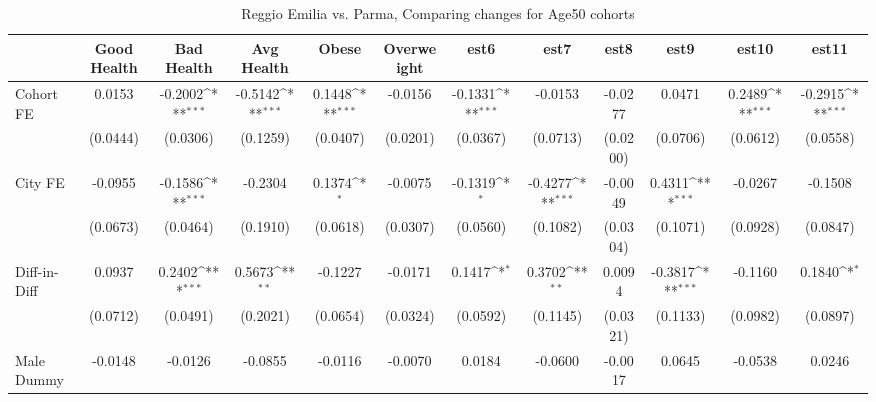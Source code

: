 \begin{table}[htbp]\centering
\def\sym#1{\ifmmode^{#1}\else\(^{#1}\)\fi}
\caption{Reggio Emilia vs. Parma, Comparing changes for Age50 cohorts}
\begin{tabular}{l*{11}{c}}
\toprule
            &\multicolumn{1}{c}{Good Health}&\multicolumn{1}{c}{Bad Health}&\multicolumn{1}{c}{Avg Health}&\multicolumn{1}{c}{Obese}&\multicolumn{1}{c}{Overweight}&\multicolumn{1}{c}{est6}&\multicolumn{1}{c}{est7}&\multicolumn{1}{c}{est8}&\multicolumn{1}{c}{est9}&\multicolumn{1}{c}{est10}&\multicolumn{1}{c}{est11}\\
\midrule
Cohort FE   &      0.0153         &     -0.2002\sym{***}&     -0.5142\sym{***}&      0.1448\sym{***}&     -0.0156         &     -0.1331\sym{***}&     -0.0153         &     -0.0277         &      0.0471         &      0.2489\sym{***}&     -0.2915\sym{***}\\
            &    (0.0444)         &    (0.0306)         &    (0.1259)         &    (0.0407)         &    (0.0201)         &    (0.0367)         &    (0.0713)         &    (0.0200)         &    (0.0706)         &    (0.0612)         &    (0.0558)         \\
\addlinespace
City FE     &     -0.0955         &     -0.1586\sym{***}&     -0.2304         &      0.1374\sym{*}  &     -0.0075         &     -0.1319\sym{*}  &     -0.4277\sym{***}&     -0.0049         &      0.4311\sym{***}&     -0.0267         &     -0.1508         \\
            &    (0.0673)         &    (0.0464)         &    (0.1910)         &    (0.0618)         &    (0.0307)         &    (0.0560)         &    (0.1082)         &    (0.0304)         &    (0.1071)         &    (0.0928)         &    (0.0847)         \\
\addlinespace
Diff-in-Diff&      0.0937         &      0.2402\sym{***}&      0.5673\sym{**} &     -0.1227         &     -0.0171         &      0.1417\sym{*}  &      0.3702\sym{**} &      0.0094         &     -0.3817\sym{***}&     -0.1160         &      0.1840\sym{*}  \\
            &    (0.0712)         &    (0.0491)         &    (0.2021)         &    (0.0654)         &    (0.0324)         &    (0.0592)         &    (0.1145)         &    (0.0321)         &    (0.1133)         &    (0.0982)         &    (0.0897)         \\
\addlinespace
Male Dummy  &     -0.0148         &     -0.0126         &     -0.0855         &     -0.0116         &     -0.0070         &      0.0184         &     -0.0600         &     -0.0017         &      0.0645         &     -0.0538         &      0.0246         \\

\end{tabular}
\end{table}
